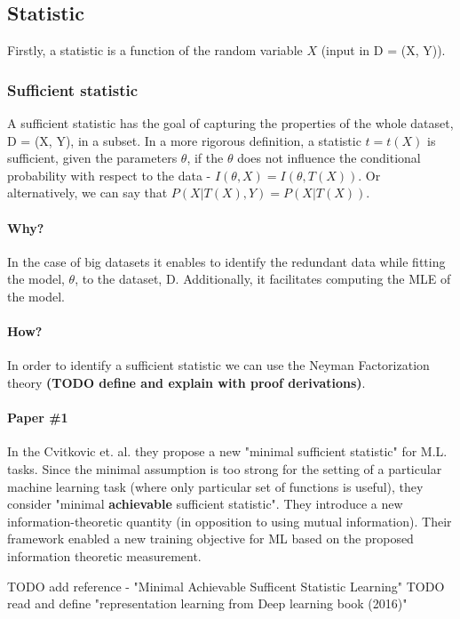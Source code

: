 \documentclass[12pt]{article}
\begin{document}
\subsection{Statistic}
Firstly, a statistic is a function of the random variable $X$ (input in D = (X, Y)).

\subsubsection{Sufficient statistic}
A sufficient statistic has the goal of capturing the properties of the whole dataset, D = (X, Y), in a subset.
In a more rigorous definition, a statistic $t = t(X)$ is sufficient, given the parameters $\theta$, if the $\theta$ does not influence the conditional probability with respect to the data - $I(\theta, X) = I(\theta, T(X))$.
Or alternatively, we can say that $P(X|T(X), Y) = P(X|T(X))$.

\paragraph{Why?}
In the case of big datasets it enables to identify the redundant data while fitting the model, $\theta$, to the dataset, D.
Additionally, it facilitates computing the MLE of the model.

\paragraph{How?}
In order to identify a sufficient statistic we can use the Neyman Factorization theory \textbf{(TODO define and explain with proof derivations)}.


\paragraph{Paper \#1}
In the Cvitkovic et. al. \cite{} they propose a new "minimal sufficient statistic" for M.L. tasks.
Since the minimal assumption is too strong for the setting of a particular machine learning task (where only particular set of functions is useful), they consider "minimal \textbf{achievable} sufficient statistic".
They introduce a new information-theoretic quantity (in opposition to using mutual information).
Their framework enabled a new training objective for ML based on the proposed information theoretic measurement.

TODO add reference - "Minimal Achievable Sufficent Statistic Learning"
TODO read and define "representation learning from Deep learning book (2016)"
\end{document}
